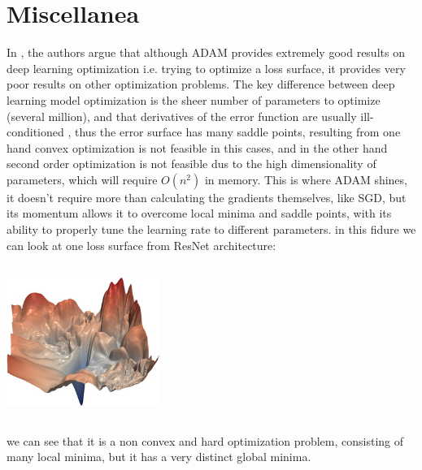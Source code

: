 \documentclass[10pt,a4paper]{article}
\begin{document}
\section{Miscellanea}
In \cite{vaswani2019painless}, the authors argue that although ADAM provides extremely good results on deep learning optimization i.e. trying to optimize a loss surface, it provides very poor results on other optimization problems.
The key difference between deep learning model optimization is the sheer number of parameters to optimize (several million), and that derivatives of the error function are usually ill-conditioned \cite{li2017visualizing}, thus the error surface has many saddle points, resulting from one hand convex optimization is not feasible in this cases, and in the other hand second order optimization is not feasible dus to the high dimensionality of parameters, which will require $O(n^2)$ in memory. This is where ADAM shines, it doesn't require more than calculating the gradients themselves, like SGD, but its momentum allows it to overcome local minima and saddle points, with its ability to properly tune the learning rate to different parameters.
in this fidure we can look at one loss surface from ResNet architecture:
\begin{center}

    \includegraphics[width=5cm, height=5cm]{resnet56_noshort_small.jpg}
\end{center}
we can see that it is a non convex and hard optimization problem, consisting of many local minima, but it has a very distinct global minima.


\end{document}
